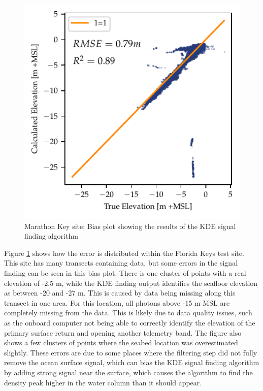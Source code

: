 \begin{figure}[!ht]
    \centering
    \includegraphics{figures/florida_keys_lidar_estimated_vs_truth.pdf}
    \caption[Marathon Key site: Error bias plot]{Marathon Key site: Bias plot showing the results of the KDE signal finding algorithm}
    \label{fig:keys-biasplot}
\end{figure}

Figure \ref{fig:keys-biasplot} shows how the error is distributed within the Florida Keys test site. This site has many transects containing data, but some errors in the signal finding can be seen in this bias plot. There is one cluster of points with a real elevation of -2.5 m, while the KDE finding output identifies the seafloor elevation as between -20 and -27 m. This is caused by data being missing along this transect in one area. For this location, all photons above -15 m MSL are completely missing from the data. This is likely due to data quality issues, such as the onboard computer not being able to correctly identify the elevation of the primary surface return and opening another telemetry band. The figure also shows a few clusters of points where the seabed location was overestimated slightly. These errors are due to some places where the filtering step did not fully remove the ocean surface signal, which can bias the KDE signal finding algorithm by adding strong signal near the surface, which causes the algorithm to find the density peak higher in the water column than it should appear.

